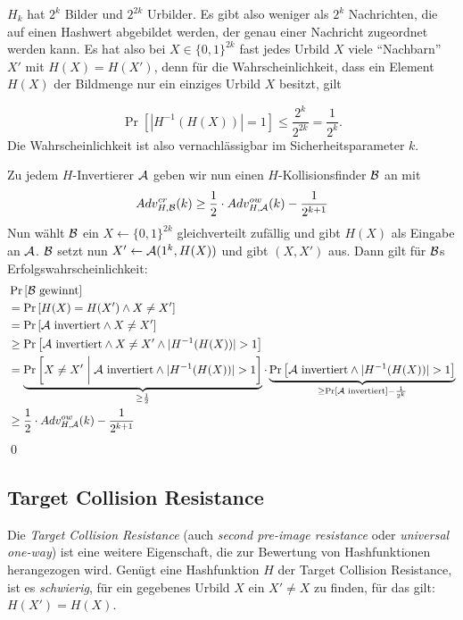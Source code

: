 \begin{beweisidee}
$H_k$ hat $2^k$ Bilder und $2^{2k}$ Urbilder. Es gibt also weniger als
$2^k$ Nachrichten, die auf einen Hashwert abgebildet werden, der genau einer
Nachricht zugeordnet werden kann. Es hat also bei $X \in \{0,1\}^{2k}$ fast jedes
Urbild $X$ viele "`Nachbarn"' $X'$ mit $H(X) = H(X')$, denn für die
Wahrscheinlichkeit, dass ein Element $H(X)$ der Bildmenge nur ein
einziges Urbild $X$ besitzt, gilt

\begin{equation*}
\Pr \left[ | H^{-1}(H(X))| = 1\right] \leq \frac{2^k}{2^{2k}} = \frac{1}{2^k}.
\end{equation*}
Die Wahrscheinlichkeit ist also vernachlässigbar im Sicherheitsparameter
$k$.
\end{beweisidee}

\begin{beweis}
Zu jedem $H$-Invertierer $\mathcal{A}$ geben wir nun einen $H$-Kollisionsfinder $\mathcal{B}$ an mit
\begin{equation*}
Adv^{cr}_{H,\mathcal{B}}(k) \geq \frac{1}{2} \cdot Adv^{ow}_{H,\mathcal{A}}(k) - \frac{1}{2^{k+1}}
\end{equation*} 
Nun wählt $\mathcal{B}$ ein $X \leftarrow \{0,1\}^{2k}$ gleichverteilt zufällig
und gibt $H(X)$ als Eingabe an $\mathcal{A}$. $\mathcal{B}$ setzt nun $X' \leftarrow
\mathcal{A}(1^k, H(X))$ und gibt $(X, X')$ aus. Dann gilt für $\mathcal{B}$s
Erfolgswahrscheinlichkeit:
\begin{align*}
	&\Pr \left[\mathcal{B} \text{ gewinnt}\right]\\
	&= \Pr\left[H(X) = H(X') \land X \not = X'\right]\\
	&= \Pr \left[\mathcal{A} \text{ invertiert} \land X \not = X'\right]\\
	&\geq \Pr \left[\mathcal{A} \text{ invertiert} \land X \not = X' \land \vert H^{-1}(H(X)) \vert > 1\right]\\
	&= \underbrace{\Pr \left[X \not = X' \biggm| \mathcal{A} \text{ invertiert} \land \vert H^{-1}(H(X)) \vert > 1\right]}_{\geq \frac{1}{2}}
	\cdot \underbrace{\Pr \left[\mathcal{A} \text{ invertiert} \land \vert H^{-1}(H(X)) \vert > 1\right]}_{\geq \Pr \left[\mathcal{A} \text{ invertiert}\right] - \frac{1}{2^k}}\\
	&\geq \frac{1}{2} \cdot Adv^{ow}_{H,\mathcal{A}}(k) - \frac{1}{2^{k+1}}
\end{align*}
\qed
\end{beweis}


\subsection{Target Collision Resistance}
Die \emph{Target Collision Resistance} \indexTargetCollisionResistance
(auch \emph{second pre-image resistance} oder \emph{universal one-way})
ist eine weitere Eigenschaft, die zur Bewertung von Hashfunktionen
herangezogen wird. Genügt eine Hashfunktion $H$ der Target Collision
Resistance, ist es \textit{schwierig}, für ein gegebenes Urbild $X$ ein
$X' \not = X$ zu finden, für das gilt: $H(X') = H(X)$.

